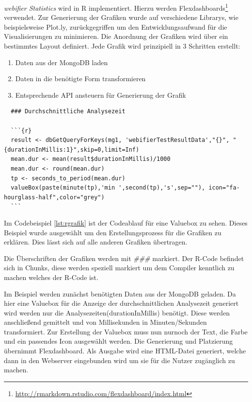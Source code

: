 \textit{webifier Statistics} wird in R implementiert. Hierzu werden
Flexdashboards\footnote{\url{http://rmarkdown.rstudio.com/flexdashboard/index.html}} verwendet. Zur Generierung der Grafiken wurde auf verschiedene Librarys, wie beispielsweise Plot.ly, zurückgegriffen um den Entwicklungsaufwand für die Visualisierungen zu minimieren. Die Anordnung der Grafiken wird über ein bestimmtes Layout definiert. Jede Grafik wird prinzipiell in 3 Schritten erstellt:

\begin{enumerate}
  \item Daten aus der MongoDB laden
  \item Daten in die benötigte Form transformieren
  \item Entsprechende API ansteuern für Generierung der Grafik
\end{enumerate}

\begin{scriptsize}
\begin{lstlisting}
  ### Durchschnittliche Analysezeit

  ```{r}
  result <- dbGetQueryForKeys(mg1, 'webifierTestResultData',"{}", "{durationInMillis:1}",skip=0,limit=Inf)
  mean.dur <- mean(result$durationInMillis)/1000
  mean.dur <- round(mean.dur)
  tp <- seconds_to_period(mean.dur)
  valueBox(paste(minute(tp),'min ',second(tp),'s',sep=""), icon="fa-hourglass-half",color="grey")
  ```
\end{lstlisting}
\end{scriptsize}

Im Codebeispiel \ref{lst:rgrafik} ist der Codeablauf für eine Valuebox zu sehen. Dieses Beispiel wurde ausgewählt um den Erstellungsprozess für die Grafiken zu erklären. Dies lässt sich auf alle anderen Grafiken übertragen.

Die Überschriften der Grafiken werden mit \textit{\#\#\#} markiert. Der R-Code befindet sich in Chunks, diese werden speziell markiert um dem Compiler kenntlich zu machen welches der R-Code ist.

Im Beispiel werden zunächst benötigten Daten aus der MongoDB geladen. Da hier eine Valuebox für die Anzeige der durchschnittlichen Analysezeit generiert wird werden nur die Analysezeiten(durationInMillis) benötigt. Diese werden anschließend gemittelt und von Millisekunden in Minuten/Sekunden transformiert. Zur Erstellung der Valuebox muss nun nurnoch der Text, die Farbe und ein passendes Icon ausgewählt werden. Die Generierung und Platzierung übernimmt Flexdashboard. Als Ausgabe wird eine HTML-Datei generiert, welche dann in den Webserver eingebunden wird um sie für die Nutzer zugänglich zu machen.


